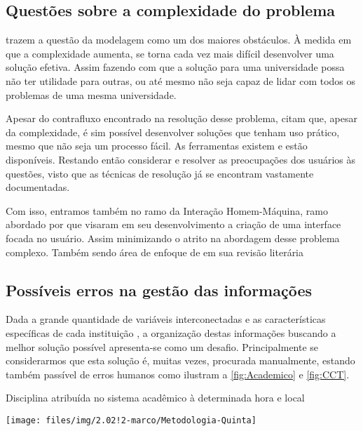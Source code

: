 \subsection{Questões sobre a complexidade do problema} \label{ssec:desafios}                                                      %


 trazem a questão da modelagem como um dos maiores obstáculos. À medida em que a complexidade aumenta, se torna cada vez mais difícil desenvolver uma solução efetiva. Assim fazendo com que a solução para uma universidade possa não ter utilidade para outras, ou até mesmo não seja capaz de lidar com todos os problemas de uma mesma universidade.

Apesar do contrafluxo encontrado na resolução desse problema,  citam que, apesar da complexidade, é sim possível desenvolver soluções que tenham uso prático, mesmo que não seja um processo fácil. As ferramentas existem e estão disponíveis. Restando então considerar e resolver as preocupações dos usuários às questões, visto que as técnicas de resolução já se encontram vastamente documentadas.

Com isso, entramos também no ramo da Interação Homem-Máquina, ramo abordado por  que visaram em seu desenvolvimento a criação de uma interface focada no usuário. Assim minimizando o atrito na abordagem desse problema complexo. Também sendo área de enfoque de  em sua revisão literária

\subsection{Possíveis erros na gestão das informações} \label{ssec:erros}                                                    %

Dada a grande quantidade de variáveis interconectadas e as características específicas de cada instituição \cite{Miranda2012}, a organização destas informações buscando a melhor solução possível apresenta-se como um desafio. Principalmente se considerarmos que esta solução é, muitas vezes, procurada manualmente, estando também passível de erros humanos como ilustram a \autoref{fig:Academico} e \autoref{fig:CCT}.

\begin{MyCenteredFigure} \caption{Disciplina atribuída no sistema acadêmico à determinada hora e local} \label{fig:Academico}
  \texttt{[image: files/img/2.02!2-marco/Metodologia-Quinta]}
\end{MyCenteredFigure}

